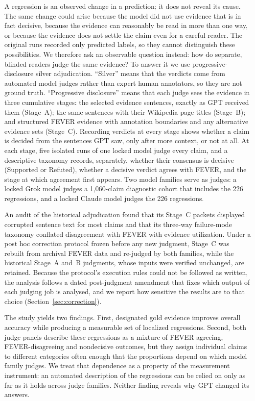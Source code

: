 A regression is an observed change in a prediction; it does not reveal its cause.
The same change could arise because the model did not use evidence that is in fact decisive, because the evidence can reasonably be read in more than one way, or because the evidence does not settle the claim even for a careful reader.
The original runs recorded only predicted labels, so they cannot distinguish these possibilities.
We therefore ask an observable question instead: how do separate, blinded readers judge the same evidence?
To answer it we use progressive-disclosure silver adjudication.
``Silver'' means that the verdicts come from automated model judges rather than expert human annotators, so they are not ground truth.
``Progressive disclosure'' means that each judge sees the evidence in three cumulative stages: the selected evidence sentences, exactly as GPT received them (Stage~A); the same sentences with their Wikipedia page titles (Stage~B); and structured FEVER evidence with annotation boundaries and any alternative evidence sets (Stage~C).
Recording verdicts at every stage shows whether a claim is decided from the sentences GPT saw, only after more context, or not at all.
At each stage, five isolated runs of one locked model judge every claim, and a descriptive taxonomy records, separately, whether their consensus is decisive (Supported or Refuted), whether a decisive verdict agrees with FEVER, and the stage at which agreement first appears.
Two model families serve as judges: a locked Grok model judges a 1{,}060-claim diagnostic cohort that includes the 226 regressions, and a locked Claude model judges the 226 regressions.

An audit of the historical adjudication found that its Stage~C packets displayed corrupted sentence text for most claims and that its three-way failure-mode taxonomy conflated disagreement with FEVER with evidence utilization.
Under a post hoc correction protocol frozen before any new judgment, Stage~C was rebuilt from archival FEVER data and re-judged by both families, while the historical Stage~A and~B judgments, whose inputs were verified unchanged, are retained.
Because the protocol's execution rules could not be followed as written, the analysis follows a dated post-judgment amendment that fixes which output of each judging job is analysed, and we report how sensitive the results are to that choice (Section~\ref{sec:correction}).

The study yields two findings.
First, designated gold evidence improves overall accuracy while producing a measurable set of localized regressions.
Second, both judge panels describe these regressions as a mixture of FEVER-agreeing, FEVER-disagreeing and nondecisive outcomes, but they assign individual claims to different categories often enough that the proportions depend on which model family judges.
We treat that dependence as a property of the measurement instrument: an automated description of the regressions can be relied on only as far as it holds across judge families.
Neither finding reveals why GPT changed its answers.

